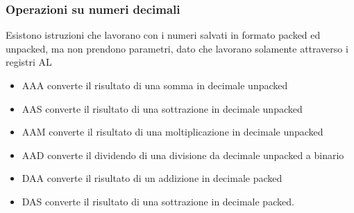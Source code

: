 \documentclass[../template]{subfiles}
\begin{document}
\subsubsection{Operazioni su numeri decimali}
Esistono istruzioni che lavorano con i numeri salvati in formato packed ed unpacked, ma non prendono parametri, dato che
lavorano solamente attraverso i registri AL

\begin{itemize}
    \item AAA converte il risultato di una somma in decimale unpacked
    \item AAS converte il risultato di una sottrazione in decimale unpacked
    \item AAM converte il risultato di una moltiplicazione in decimale unpacked
    \item AAD converte il dividendo di una divisione da decimale unpacked a binario
    \item DAA converte il risultato di un addizione in decimale packed
    \item DAS converte il risultato di una sottrazione in decimale packed.
\end{itemize}
\end{document}
